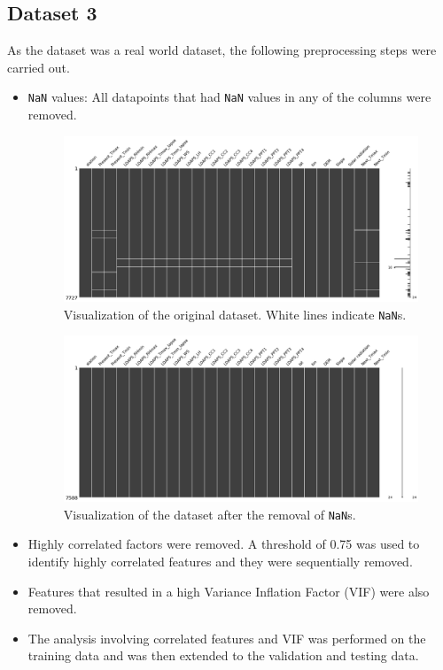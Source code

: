 \documentclass[12pt,a4paper]{article}
\def\tt#1{\texttt{#1}}
\begin{document}
\subsection{Dataset 3}
As the dataset was a real world dataset, the following preprocessing steps were carried out.
\begin{itemize}
    \itemsep0em
    \item \tt{NaN} values: All datapoints that had \tt{NaN} values in any of the columns were removed. 
        \begin{figure}[H]
            \centering
            \includegraphics[scale=0.2]{images/missingno.png}
            \caption{Visualization of the original dataset. White lines indicate \tt{NaN}s.}
        \end{figure}

        \begin{figure}[H]
            \centering
            \includegraphics[scale=0.2]{images/cleaned.png}
            \caption{Visualization of the dataset after the removal of \tt{NaN}s.}
        \end{figure}

    \item Highly correlated factors were removed. A threshold of 0.75 was used to identify highly correlated features and they were sequentially removed.
    \item Features that resulted in a high Variance Inflation Factor (VIF) were also removed.
    \item The analysis involving correlated features and VIF was performed on the training data and was then extended to the validation and testing data. 
\end{itemize}
\end{document}
